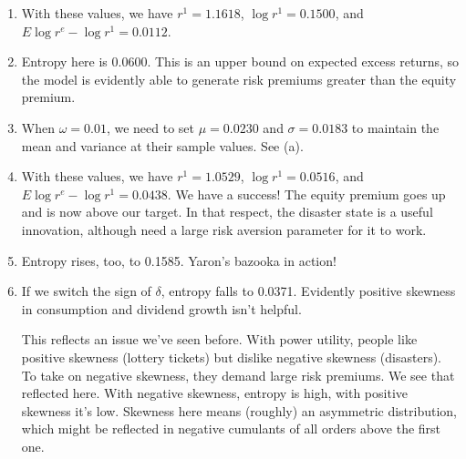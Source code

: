 \documentclass[11pt]{article}
\begin{document}
\begin{enumerate}
\begin{enumerate}
\item With these values, we have
$r^1 = 1.1618$, $\log r^1 = 0.1500$, and
$E \log r^e - \log r^1 = 0.0112 $.

\item Entropy here is 0.0600.
This is an upper bound on expected excess returns,
so the model is evidently able to generate risk premiums greater than the equity premium.

\item When $\omega = 0.01$,
we need to set $\mu = 0.0230$ and $\sigma = 0.0183$ to maintain the mean and
variance at their sample values.
See (a).

\item With these values, we have
$r^1 = 1.0529$, $\log r^1 = 0.0516$, and
$E \log r^e - \log r^1 = 0.0438 $.
We have a success!
The equity premium goes up and is now above our target.
In that respect, the disaster state is a useful innovation,
although need a large risk aversion parameter for it to work.

\item Entropy rises, too, to 0.1585.  Yaron's bazooka in action!

\item If we switch the sign of $\delta$,
entropy falls to 0.0371.
Evidently positive skewness in consumption and dividend growth
isn't helpful.

This reflects an issue we've seen before.  With power utility,
people like positive skewness (lottery tickets)
but dislike negative skewness (disasters).
To take on negative skewness, they demand large risk premiums.
We see that reflected here.
With negative skewness, entropy is high, with positive skewness
it's low.
Skewness here means (roughly) an asymmetric distribution,
which might be reflected in negative cumulants of all orders above the first one.
\end{enumerate}

\end{enumerate} 
\end{document}
